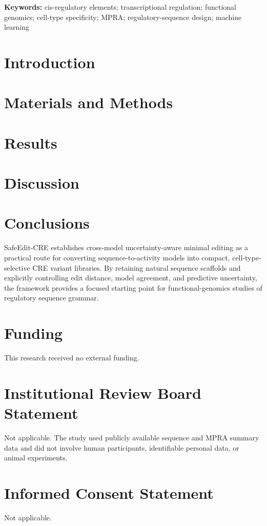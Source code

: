 \documentclass[10pt,a4paper]{article}
\begin{document}
\noindent\textbf{Keywords:} cis-regulatory elements; transcriptional regulation;
functional genomics; cell-type specificity; MPRA; regulatory-sequence design;
machine learning

\section{Introduction}


\section{Materials and Methods}


\section{Results}


\section{Discussion}


\section{Conclusions}
SafeEdit-CRE establishes cross-model uncertainty-aware minimal editing as a practical
route for converting sequence-to-activity models into compact, cell-type-selective CRE
variant libraries. By retaining natural sequence scaffolds and explicitly controlling
edit distance, model agreement, and predictive uncertainty, the framework provides a
focused starting point for functional-genomics studies of regulatory sequence grammar.

\section*{Funding}
This research received no external funding.

\section*{Institutional Review Board Statement}
Not applicable. The study used publicly available sequence and MPRA summary data and
did not involve human participants, identifiable personal data, or animal experiments.

\section*{Informed Consent Statement}
Not applicable.
\end{document}
